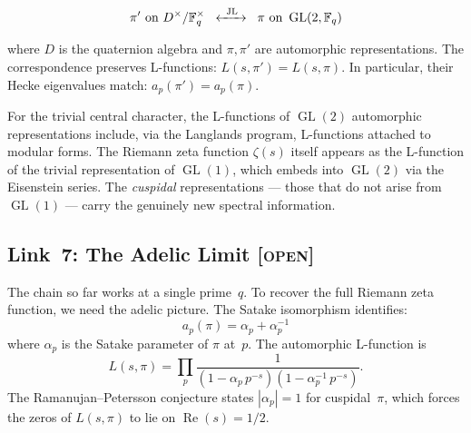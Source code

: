 \documentclass[12pt,reqno]{amsart}
\theoremstyle{plain}
\theoremstyle{definition}
\theoremstyle{remark}
\DeclareMathOperator{\GL}{GL}
\newcommand{\FF}{\mathbb{F}}
\begin{document}
\begin{equation}\label{eq:jl}
  \pi' \text{ on } D^\times / \FF_q^\times
  \;\;\xleftrightarrow{\;\;\text{JL}\;\;}\;\;
  \pi \text{ on } \GL(2, \FF_q)
\end{equation}

where $D$ is the quaternion algebra and $\pi, \pi'$ are automorphic
representations.  The correspondence preserves L-functions:
$L(s, \pi') = L(s, \pi)$.  In particular, their Hecke eigenvalues
match: $a_p(\pi') = a_p(\pi)$.

For the trivial central character, the L-functions of $\GL(2)$
automorphic representations include, via the Langlands program,
L-functions attached to modular forms.  The Riemann zeta function
$\zeta(s)$ itself appears as the L-function of the trivial
representation of $\GL(1)$, which embeds into $\GL(2)$ via the
Eisenstein series.  The \emph{cuspidal} representations --- those
that do not arise from $\GL(1)$ --- carry the genuinely new spectral
information.

\subsection{Link~7: The Adelic Limit
  \textnormal{[\textsc{open}]}}

The chain so far works at a single prime~$q$.  To recover the full
Riemann zeta function, we need the adelic picture.  The Satake
isomorphism identifies:
\begin{equation}\label{eq:satake}
  a_p(\pi) = \alpha_p + \alpha_p^{-1}
\end{equation}
where $\alpha_p$ is the Satake parameter of $\pi$ at~$p$.  The
automorphic L-function is
\begin{equation}\label{eq:automorphic_L}
  L(s, \pi) = \prod_p \frac{1}{(1 - \alpha_p\, p^{-s})
  (1 - \alpha_p^{-1}\, p^{-s})}.
\end{equation}
The Ramanujan--Petersson conjecture states $|\alpha_p| = 1$ for
cuspidal~$\pi$, which forces the zeros of $L(s,\pi)$ to lie on
$\operatorname{Re}(s) = 1/2$.
\end{document}
